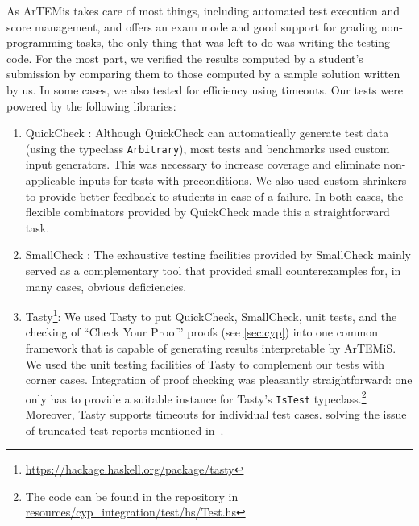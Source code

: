 As ArTEMis takes care of most things,
including automated test execution and score management,
and offers an exam mode and good support for grading non-programming tasks,
the only thing that was left to do was writing the testing code.
For the most part, we verified the results computed
by a student's submission by comparing them to those
computed by a sample solution written by us.
In some cases, we also tested for efficiency using timeouts.
Our tests were powered by the following libraries:
\begin{enumerate}
  \item QuickCheck \cite{quickcheck}:
  Although QuickCheck can automatically generate test data (using the typeclass \texttt{Arbitrary}),
  most tests and benchmarks used custom input generators.
  This was necessary to increase coverage and eliminate non-applicable inputs for tests with preconditions.
  We also used custom shrinkers to provide better feedback to students in case of a failure.
  In both cases, the flexible combinators provided by QuickCheck made this a straightforward task.
  \item SmallCheck \cite{smallcheck}: The exhaustive testing facilities provided by SmallCheck mainly served
    as a complementary tool that provided small counterexamples for, in many cases, obvious deficiencies.
  \item Tasty\footnote{\url{https://hackage.haskell.org/package/tasty}}: We used Tasty to put QuickCheck, SmallCheck, unit tests, and the checking of ``Check Your Proof'' proofs (see \cref{sec:cyp}) into one common framework that is capable of generating results interpretable by ArTEMiS.
  We used the unit testing facilities of Tasty to complement our tests with corner cases.
  Integration of proof checking was pleasantly straightforward:
  one only has to provide a suitable instance for Tasty's \texttt{IsTest} typeclass.\footnote{The code can be found in the repository in \href{https://github.com/kappelmann/engaging-large-scale-functional-programming/tree/main/resources/io_mocking/typeclass}{resources/cyp\_integration/test/hs/Test.hs}}
  Moreover, Tasty supports timeouts for individual test cases.
  solving the issue of truncated test reports mentioned in~\cite{next_1100}.
\end{enumerate}

